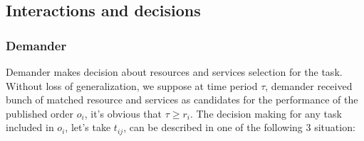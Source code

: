 \subsection{Interactions and decisions} %
\label{sub:interactions_and_decisions}
\subsubsection{Demander}
\label{subs:Demander}
Demander makes decision about resources and services selection for the task. Without loss of generalization, we suppose at time period $\tau$, demander received bunch of matched resource and services as candidates for the performance of the published order $o_i$, it's obvious that $\tau \ge r_{i}$. The decision making for any task included in $o_i$, let's take $t_{ij}$, can be described in one of the following 3 situation:

